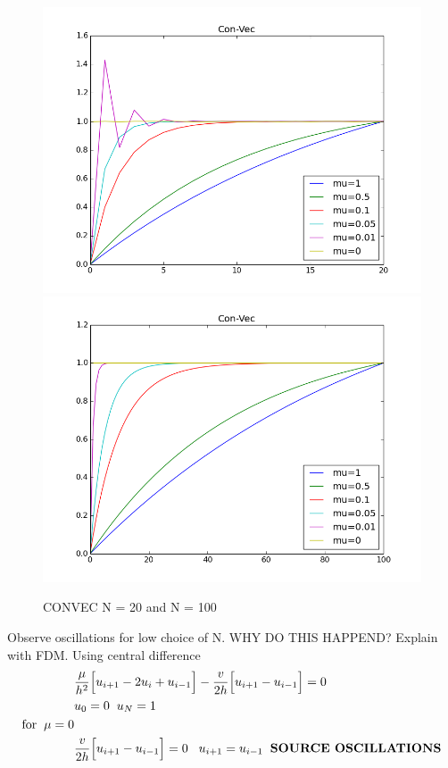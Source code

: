 \documentclass[a4paper,norsk]{article}
\begin{document}
\begin{figure}[h!]
	\centering
	\caption*{CONVEC N = 20 and N = 100}
	\includegraphics[scale=0.32]{convec.png}
	\includegraphics[scale=0.32]{convechighn.png}
\end{figure}
Observe oscillations for low choice of N. WHY DO THIS HAPPEND? Explain with FDM.
Using central difference
\begin{align*}
&\frac{\mu}{h^2}\Big[u_{i+1} - 2u_{i} + u_{i-1} \Big] - \frac{v}{2 h} \Big[u_{i+1} - u_{i-1} \Big] = 0 \\
&u_0 = 0 \hspace{2mm} u_N = 1 \hspace{3mm} \\ 
\text{for} \hspace{2mm} \mu = 0 \\
&\frac{v}{2 h} \Big[u_{i+1} - u_{i-1} \Big] = 0 \hspace{3mm} u_{i+1} = u_{i-1} \hspace{2mm} \textbf{SOURCE OSCILLATIONS}
\end{align*}
\end{document}
